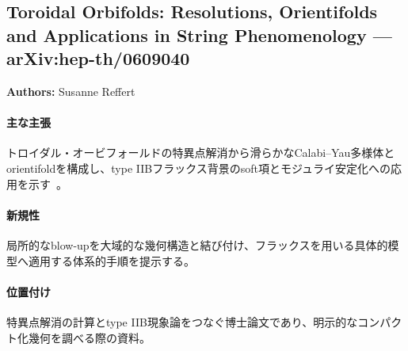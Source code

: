 \subsection{Toroidal Orbifolds: Resolutions, Orientifolds and Applications in String Phenomenology --- arXiv:hep-th/0609040}

\textbf{Authors:} Susanne Reffert

\paragraph{主な主張}
トロイダル・オービフォールドの特異点解消から滑らかなCalabi--Yau多様体とorientifoldを構成し、type IIBフラックス背景のsoft項とモジュライ安定化への応用を示す~\cite{Reffert:2006du}。

\paragraph{新規性}
局所的なblow-upを大域的な幾何構造と結び付け、フラックスを用いる具体的模型へ適用する体系的手順を提示する。

\paragraph{位置付け}
特異点解消の計算とtype IIB現象論をつなぐ博士論文であり、明示的なコンパクト化幾何を調べる際の資料。
